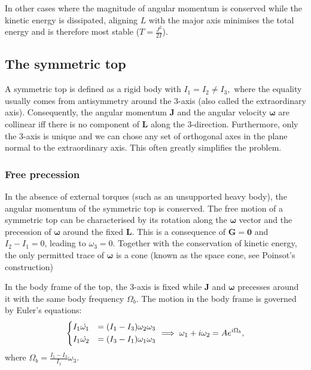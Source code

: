 \documentclass{article}
\begin{document}
In other cases where the magnitude of angular momentum is conserved while the kinetic energy is dissipated, aligning $L$ with the major axis minimises the total energy and is therefore most stable ($T = \frac{J^2}{2I}$). 

\subsection{The symmetric top}
A symmetric top is defined as a rigid body with $I_1 = I_2 \neq I_3,$ where the equality usually comes from antisymmetry around the 3-axis (also called the extraordinary axis). Consequently, the angular momentum $\mathbf{J} $ and the angular velocity $\boldsymbol{\mathbf{\omega}} $ are collinear iff there is no component of $\mathbf{L}$ along the 3-direction. Furthermore, only the 3-axis is unique and we can chose any set of orthogonal axes in the plane normal to the extraordinary axis. This often greatly simplifies the problem. 

\subsubsection{Free precession}
In the absence of external torques (such as an unsupported heavy body), the angular momentum of the symmetric top is conserved. The free motion of a symmetric top can be characterised by its rotation along the $\boldsymbol{\mathbf{\omega}}$ vector and the precession of $\boldsymbol{\mathbf{\omega}}$ around the fixed $\mathbf{L} $. This is a consequence of $\mathbf{G} = \textbf{0} $ and $I_2 - I_1 = 0$, leading to $\omega_3 = 0$. Together with the conservation of kinetic energy, the only permitted trace of $\boldsymbol{\mathbf{\omega}}$ is a cone (known as the space cone, see Poinsot's construction)

In the body frame of the top, the 3-axis is fixed while $\mathbf{J}$ and $\boldsymbol{\mathbf{\omega}}$ precesses around it with the same body frequency $\Omega_b.$ The motion in the body frame is governed by Euler's equations:
\[
    \begin{dcases}
        I_1 \dot{\omega_1} &= (I_1 - I_3) \omega_2 \omega_3   \\
        I_1 \dot{\omega_2} &= (I_3 - I_1) \omega_1 \omega_3
    \end{dcases}
    \implies 
    \omega_1 + i \omega_2 = A e^{i \Omega_b},
\]
where $\boxed{\Omega_b = \frac{I_1 - I_3}{I_1}\omega_3}. $
\end{document}

